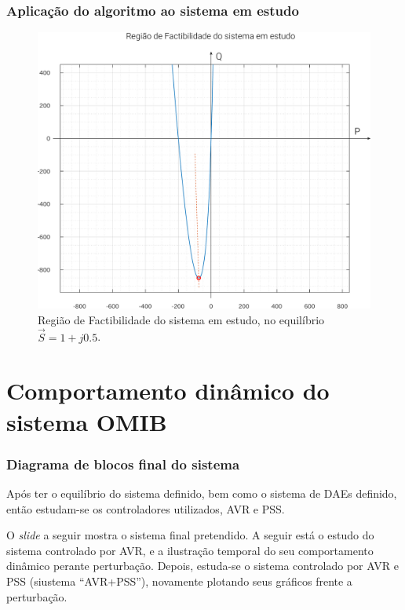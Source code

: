 \documentclass[10pt, compress,xcolor={svgnames,dvipsnames,x11names}]{beamer}
\begin{document}
\begin{frame}%
\frametitle{ Aplicação do algoritmo ao sistema em estudo }
\scriptsize

\begin{figure}[htb]
	\begin{center}
	    \includegraphics[width = 0.8\columnwidth]{../images/presentation/regiaoDeFactibilidade.pdf}
	\end{center}
	\caption{\label{fig:regiaoDeFactibilidade} Região de Factibilidade do sistema em estudo, no equilíbrio $\vec{S} = 1 + j0.5$.}
\end{figure}

\normalsize
\end{frame}%

\section{Comportamento dinâmico do sistema OMIB} %
\begin{frame}%
\frametitle{Diagrama de blocos final do sistema}
\scriptsize

	Após ter o equilíbrio do sistema definido, bem como o sistema de DAEs definido, então estudam-se os controladores utilizados, AVR e PSS.

	O \textit{slide} a seguir mostra o sistema final pretendido. A seguir está o estudo do sistema controlado por AVR, e a ilustração temporal do seu comportamento dinâmico perante perturbação. Depois, estuda-se o sistema controlado por AVR e PSS (siustema ``AVR+PSS''), novamente plotando seus gráficos frente a perturbação.

\normalsize
\end{frame}%
\end{document}

